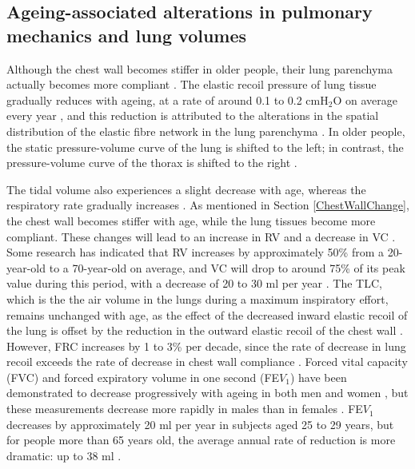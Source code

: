 \subsection{Ageing-associated alterations in pulmonary mechanics and lung volumes}
Although the chest wall becomes stiffer in older people, their lung parenchyma actually becomes more compliant \citep{mittman1965relationship, turner1968elasticity, zaugg2000respiratory}. The elastic recoil pressure of lung tissue gradually reduces with ageing, at a rate of around 0.1 to 0.2 $\mathrm{cmH_2O}$ on average every year \citep{turner1968elasticity}, and this reduction is attributed to the alterations in the spatial distribution of the elastic fibre network in the lung parenchyma \citep{sprung2006age}. In older people, the static pressure-volume curve of the lung is shifted to the left; in contrast, the pressure-volume curve of the thorax is shifted to the right \citep{zaugg2000respiratory,sprung2006age}.

The tidal volume also experiences a slight decrease with age, whereas the respiratory rate gradually increases \citep{sprung2006age}. As mentioned in Section \ref{ChestWallChange}, the chest wall becomes stiffer with age, while the lung tissues become more compliant. These changes will lead to an increase in RV and a decrease in VC \citep{lalley2013aging}. Some research has indicated that RV increases by approximately 50\% from a 20-year-old to a 70-year-old on average, and VC will drop to around 75\% of its peak value during this period, with a decrease of 20 to 30 ml per year \citep{janssens1999physiological, sprung2006age}. The TLC, which is the the air volume in the lungs during a maximum inspiratory effort, remains unchanged with age, as the effect of the decreased inward elastic recoil of the lung is offset by the reduction in the outward elastic recoil of the chest wall \citep{sprung2006age}. However, FRC increases by 1 to 3\% per decade, since the rate of decrease in lung recoil exceeds the rate of decrease in chest wall compliance \citep{janssens1999physiological, lalley2013aging}. Forced vital capacity (FVC) and forced expiratory volume in one second (FE$V_1$) have been demonstrated to decrease progressively with ageing in both men and women \citep{knudson1976maximal}, but these measurements decrease more rapidly in males than in females \citep{crapo1993aging}. FE$V_1$ decreases by approximately 20 ml per year in subjects aged 25 to 29 years, but for people more than 65 years old, the average annual rate of reduction is more dramatic: up to 38 ml \citep{brandstetter1983aging}.
\newpage

